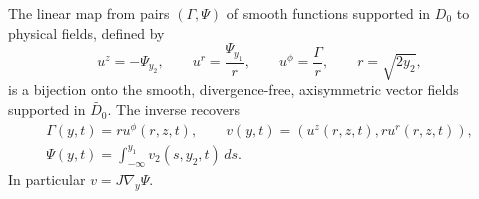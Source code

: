 \begin{proposition}
\label{prop:ec-velocity}
The linear map from pairs \((\Gamma,\Psi)\) of smooth functions supported
in \(D_0\) to physical fields, defined by
\begin{equation}
 u^z=-\Psi_{y_2},\qquad
 u^r=\frac{\Psi_{y_1}}{r},\qquad
 u^\phi=\frac{\Gamma}{r},\qquad r=\sqrt{2y_2},
 \label{eq:ec-physical-velocity}
\end{equation}
is a bijection onto the smooth, divergence-free, axisymmetric vector fields
supported in \(\widetilde{D_0}\).  The inverse recovers
\begin{equation}
 \begin{gathered}
 \Gamma(y,t)=r u^\phi(r,z,t),\qquad
 v(y,t)=(u^z(r,z,t),r u^r(r,z,t)),\\
 \Psi(y,t)=\int_{-\infty}^{y_1}v_2(s,y_2,t)\,ds.
 \end{gathered}
 \label{eq:ec-inverse}
\end{equation}
In particular \(v=J\nabla_y\Psi\).
\end{proposition}

